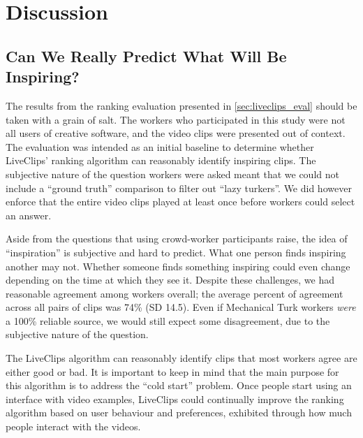 \section{Discussion}

\subsection{Can We Really Predict What Will Be Inspiring?}
The results from the ranking evaluation presented in \autoref{sec:liveclips_eval} should be taken with a grain of salt. The workers who participated in this study were not all users of creative software, and the video clips were presented out of context. The evaluation was intended as an initial baseline to determine whether LiveClips' ranking algorithm can reasonably identify inspiring clips. The subjective nature of the question workers were asked meant that we could not include a ``ground truth'' comparison to filter out ``lazy turkers''. We did however enforce that the entire video clips played at least once before workers could select an answer.

Aside from the questions that using crowd-worker participants raise, the idea of ``inspiration'' is subjective and hard to predict. What one person finds inspiring another may not. Whether someone finds something inspiring could even change depending on the time at which they see it. Despite these challenges, we had reasonable agreement among workers overall; the average percent of agreement across all pairs of clips was 74\% (SD 14.5). Even if Mechanical Turk workers \textit{were} a 100\% reliable source, we would still expect some disagreement, due to the subjective nature of the question.

The LiveClips algorithm can reasonably identify clips that most workers agree are either good or bad. It is important to keep in mind that the main purpose for this algorithm is to address the ``cold start'' problem. Once people start using an interface with video examples, LiveClips could continually improve the ranking algorithm based on user behaviour and preferences, exhibited through how much people interact with the videos. %

